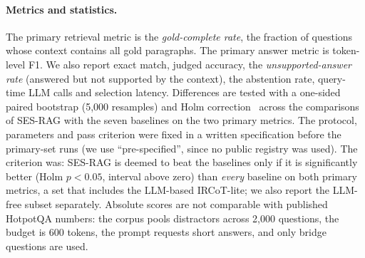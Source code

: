 \paragraph{Metrics and statistics.}
The primary retrieval metric is the \emph{gold-complete rate}, the fraction of questions whose context contains all gold paragraphs. The primary answer metric is token-level F1. We also report exact match, judged accuracy, the \emph{unsupported-answer rate} (answered but not supported by the context), the abstention rate, query-time LLM calls and selection latency. Differences are tested with a one-sided paired bootstrap (5{,}000 resamples) and Holm correction~\cite{holm1979simple,efron1993bootstrap} across the comparisons of SES-RAG with the seven baselines on the two primary metrics. The protocol, parameters and pass criterion were fixed in a written specification before the primary-set runs (we use ``pre-specified'', since no public registry was used). The criterion was: SES-RAG is deemed to beat the baselines only if it is significantly better (Holm $p<0.05$, interval above zero) than \emph{every} baseline on both primary metrics, a set that includes the LLM-based IRCoT-lite; we also report the LLM-free subset separately. Absolute scores are not comparable with published HotpotQA numbers: the corpus pools distractors across 2{,}000 questions, the budget is 600 tokens, the prompt requests short answers, and only bridge questions are used.
